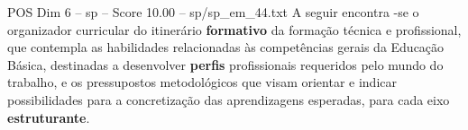 \begin{textsample}{POS Dim 6 – sp – Score 10.00 – sp/sp\_em\_44.txt}
A seguir encontra -se o organizador curricular do itinerário \textbf{formativo} da formação técnica e profissional, que contempla as habilidades relacionadas às competências gerais da Educação Básica, destinadas a desenvolver \textbf{perfis} profissionais requeridos pelo mundo do trabalho, e os pressupostos metodológicos que visam orientar e indicar possibilidades para a concretização das aprendizagens esperadas, para cada eixo \textbf{estruturante}.

\end{textsample}

